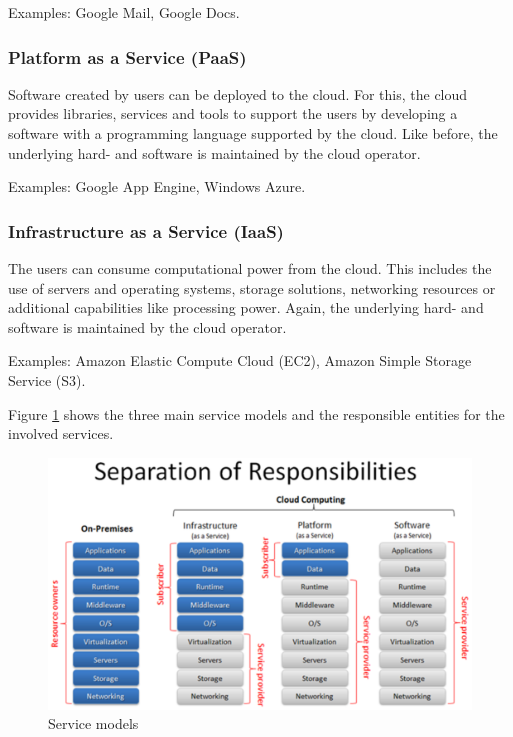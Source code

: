 Examples: Google Mail, Google Docs\cite{trustedcloudcomputing}.

\subsubsection{Platform as a Service (PaaS)}
Software created by users can be deployed to the cloud. For this, the cloud provides libraries, services and tools to support the users by developing a software with a programming language supported by the cloud. Like before, the underlying hard- and software is maintained by the cloud operator\cite{nist}.
	
Examples: Google App Engine, Windows Azure\cite{trustedcloudcomputing}. 

\subsubsection{Infrastructure as a Service (IaaS)}
The users can consume computational power from the cloud. This includes the use of servers and operating systems, storage solutions, networking resources or additional capabilities like processing power. Again, the underlying hard- and software is maintained by the cloud operator\cite{nist}.
	
Examples: Amazon Elastic Compute Cloud (EC2), Amazon Simple Storage Service (S3)\cite{trustedcloudcomputing}.

Figure \ref{fig:cloud_stack} shows the three main service models and the responsible entities for the involved services.

\begin{figure}[h]
	\centering
		\includegraphics{graphics/service_models.eps}
	\caption{Service models\cite{trustedcloudcomputing}}
	\label{fig:cloud_stack}
\end{figure}

